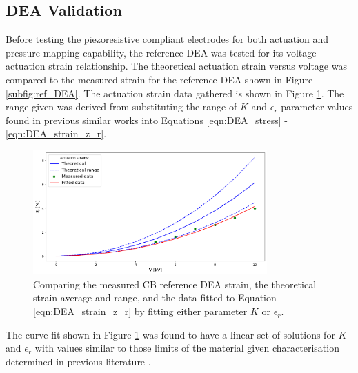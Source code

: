 \subsection{DEA Validation}
\label{subsec:dea_validation2}
Before testing the piezoresistive compliant electrodes for both actuation and pressure mapping capability, the reference DEA was tested for its voltage actuation strain relationship. The theoretical actuation strain versus voltage was compared to the measured strain for the reference DEA shown in Figure \ref{subfig:ref_DEA}. The actuation strain data gathered is shown in Figure \ref{fig:ref_DEA_results}. The range given was derived from substituting the range of $K$ and $\epsilon_r$ parameter values found in previous similar works \cite{Liu2018, Helal2018, Huang2023} into Equations \ref{eqn:DEA_stress} - \ref{eqn:DEA_strain_z_r}.
\begin{figure}[H]
	\centering
	\includegraphics[width = 0.8\textwidth]{Figures/CB_vs_theory_range_vs_fitv2.png} %
	\vspace{0.2cm}
	\caption{Comparing the measured CB reference DEA strain, the theoretical strain average and range, and the data fitted to Equation \ref{eqn:DEA_strain_z_r} by fitting either parameter $K$ or $\epsilon_r$.}
	\label{fig:ref_DEA_results}
\end{figure}
The curve fit shown in Figure \ref{fig:ref_DEA_results} was found to have a linear set of solutions for $K$ and $\epsilon_r$ with values similar to those limits of the material given characterisation determined in previous literature \cite{Carpi2003}.

